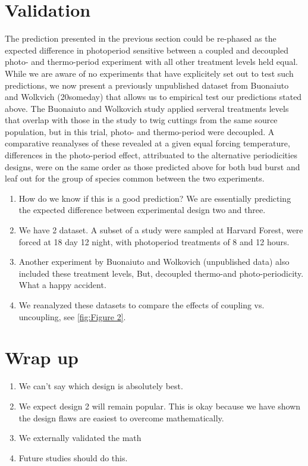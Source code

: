 \documentclass[12pt]{article}\usepackage[]{graphicx}\usepackage[]{color}
\begin{document}
\section*{Validation}
\indent\indent The prediction presented in the previous section could be re-phased as the expected difference in photoperiod sensitive between a coupled and decoupled photo- and thermo-period experiment with all other treatment levels held equal. While we are aware of no experiments that have explicitely set out to test such predictions, we now present a previously unpublished dataset from Buonaiuto and Wolkvich (20someday) that allows us to empirical test our predictions stated above. The Buonaiuto and Wolkovich study applied serveral treatments levels that overlap with those in the \citet{Flynn2018} study to twig cuttings from the same source population, but in this trial, photo- and thermo-period were decoupled. A comparative reanalyses of these revealed at a given equal forcing temperature, differences in the photo-period effect, attribuated to the alternative  periodicities designs, were on the same order as those predicted above for both bud burst and leaf out for the group of species common between the two experiments.


\begin{enumerate}
  \item How do we know if this is a good prediction? We are essentially predicting the expected difference between experimental design two and three.
\item We have 2 dataset. A subset of a \citet{Flynn2018} study were sampled  at Harvard Forest,  were forced at 18 day 12 night, with photoperiod treatments of 8 and 12 hours. 
\item Another experiment by Buonaiuto and Wolkovich (unpublished data) also included these treatment levels, But, decoupled thermo-and photo-periodicity. What a happy accident.
\item We reanalyzed these datasets to compare the effects of coupling vs. uncoupling, see \ref{fig:Figure 2}.

\end{enumerate}
 
 \section{Wrap up}
 \begin{enumerate}
\item We can't say which design is absolutely best.
\item We expect design 2 will remain popular. This is okay because we have shown the design flaws are easiest to overcome mathematically.  
\item We externally validated the math
\item Future studies should do this.
 \end{enumerate}
\end{document}
